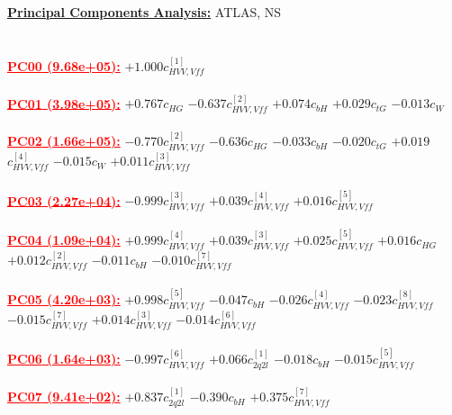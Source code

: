 \documentclass{article}
\begin{document}
\noindent \underline{\bf{Principal Components Analysis}:} ATLAS, NS\\ \\ \\
\noindent \textcolor{red}{\underline{\bf{PC00} (9.68e+05):}}
{$+1.000$}{\rm $c_{HVV,Vff}^{[1]}$}
 \nonumber \\ \nonumber \\
\noindent \textcolor{red}{\underline{\bf{PC01} (3.98e+05):}}
{$+0.767$}{\rm $c_{HG}$}
{$-0.637$}{\rm $c_{HVV,Vff}^{[2]}$}
{$+0.074$}{\rm $c_{bH}$}
{$+0.029$}{\rm $c_{tG}$}
{$-0.013$}{\rm $c_{W}$}
 \nonumber \\ \nonumber \\
\noindent \textcolor{red}{\underline{\bf{PC02} (1.66e+05):}}
{$-0.770$}{\rm $c_{HVV,Vff}^{[2]}$}
{$-0.636$}{\rm $c_{HG}$}
{$-0.033$}{\rm $c_{bH}$}
{$-0.020$}{\rm $c_{tG}$}
{$+0.019$}{\rm $c_{HVV,Vff}^{[4]}$}
{$-0.015$}{\rm $c_{W}$}
{$+0.011$}{\rm $c_{HVV,Vff}^{[3]}$}
 \nonumber \\ \nonumber \\
\noindent \textcolor{red}{\underline{\bf{PC03} (2.27e+04):}}
{$-0.999$}{\rm $c_{HVV,Vff}^{[3]}$}
{$+0.039$}{\rm $c_{HVV,Vff}^{[4]}$}
{$+0.016$}{\rm $c_{HVV,Vff}^{[5]}$}
 \nonumber \\ \nonumber \\
\noindent \textcolor{red}{\underline{\bf{PC04} (1.09e+04):}}
{$+0.999$}{\rm $c_{HVV,Vff}^{[4]}$}
{$+0.039$}{\rm $c_{HVV,Vff}^{[3]}$}
{$+0.025$}{\rm $c_{HVV,Vff}^{[5]}$}
{$+0.016$}{\rm $c_{HG}$}
{$+0.012$}{\rm $c_{HVV,Vff}^{[2]}$}
{$-0.011$}{\rm $c_{bH}$}
{$-0.010$}{\rm $c_{HVV,Vff}^{[7]}$}
 \nonumber \\ \nonumber \\
\noindent \textcolor{red}{\underline{\bf{PC05} (4.20e+03):}}
{$+0.998$}{\rm $c_{HVV,Vff}^{[5]}$}
{$-0.047$}{\rm $c_{bH}$}
{$-0.026$}{\rm $c_{HVV,Vff}^{[4]}$}
{$-0.023$}{\rm $c_{HVV,Vff}^{[8]}$}
{$-0.015$}{\rm $c_{HVV,Vff}^{[7]}$}
{$+0.014$}{\rm $c_{HVV,Vff}^{[3]}$}
{$-0.014$}{\rm $c_{HVV,Vff}^{[6]}$}
 \nonumber \\ \nonumber \\
\noindent \textcolor{red}{\underline{\bf{PC06} (1.64e+03):}}
{$-0.997$}{\rm $c_{HVV,Vff}^{[6]}$}
{$+0.066$}{\rm $c_{2q2l}^{[1]}$}
{$-0.018$}{\rm $c_{bH}$}
{$-0.015$}{\rm $c_{HVV,Vff}^{[5]}$}
 \nonumber \\ \nonumber \\
\noindent \textcolor{red}{\underline{\bf{PC07} (9.41e+02):}}
{$+0.837$}{\rm $c_{2q2l}^{[1]}$}
{$-0.390$}{\rm $c_{bH}$}
{$+0.375$}{\rm $c_{HVV,Vff}^{[7]}$}
\end{document}
